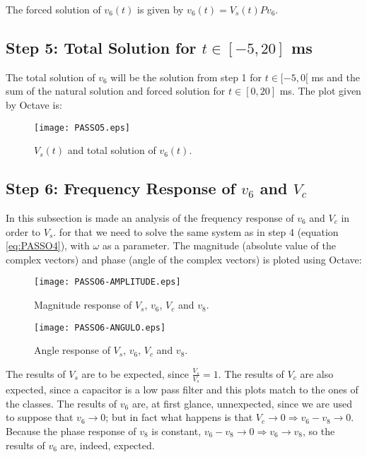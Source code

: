 The forced solution of $v_6(t)$ is given by $v_6(t) = V_s(t)Pv_6$.
\newpage
\subsection{Step 5: Total Solution for $t\in [-5,20]$ ms}

The total solution of $v_6$ will be the solution from step 1 for $t\in [-5,0[$ ms and the sum of the natural solution and forced solution for $t\in [0,20]$ ms.
The plot given by Octave is:

\begin{figure}[h] \centering
\texttt{[image: PASSO5.eps]}
\caption{$V_s(t)$ and total solution of $v_6(t)$.}
\label{fig:TEO_TOT_SOL}
\end{figure}

\newpage
\subsection{Step 6: Frequency Response of $v_6$ and $V_c$}

In this subsection is made an analysis of the frequency response of $v_6$ and $V_c$ in order to $V_s$. for that we need to solve the same system as in step 4 (equation \ref{eq:PASSO4}), with $\omega$ as a parameter. The magnitude (absolute value of the complex vectors) and phase (angle of the complex vectors) is ploted using Octave:

\begin{figure}[h] \centering
\texttt{[image: PASSO6-AMPLITUDE.eps]}
\caption{Magnitude response of $V_s$, $v_6$, $V_c$ and $v_8$.}
\label{fig:TEO_MAG}
\end{figure}

\begin{figure}[h] \centering
\texttt{[image: PASSO6-ANGULO.eps]}
\caption{Angle response of $V_s$, $v_6$, $V_c$ and $v_8$.}
\label{fig:TEO_ANG}
\end{figure}

The results of $V_s$ are to be expected, since $\frac{V_s}{V_s}=1$.
The results of $V_c$ are also expected, since a capacitor is a low pass filter and this plots match to the ones of the classes.
The results of $v_6$ are, at first glance, unnexpected, since we are used to suppose that $v_6 \to 0$; but in fact what happens is that $V_c \to 0 \Rightarrow v_6 - v_8 \to 0$. Because the phase response of $v_8$ is constant, $v_6 - v_8 \to 0 \Rightarrow v_6 \to v_8$, so the results of $v_6$ are, indeed, expected.




